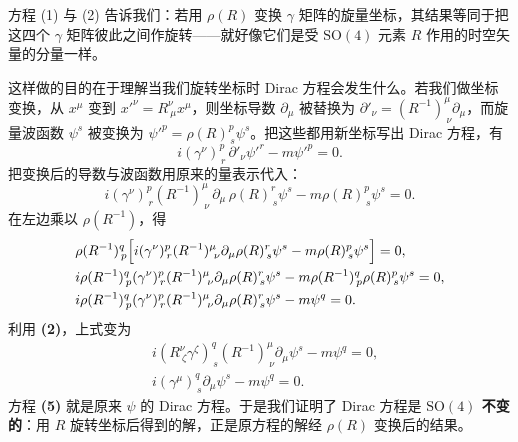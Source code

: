 方程 (1) 与 (2) 告诉我们：若用 $\rho(R)$ 变换 $\gamma$ 矩阵的旋量坐标，其结果等同于把这四个 $\gamma$ 矩阵彼此之间作旋转——就好像它们是受 $\mathrm{SO}(4)$ 元素 $R$ 作用的时空矢量的分量一样。

这样做的目的在于理解当我们旋转坐标时 Dirac 方程会发生什么。若我们做坐标变换，从 $x^{\mu}$ 变到 $x'^{\nu}=R^{\nu}_{\ \mu}x^{\mu}$，则坐标导数 $\partial_{\mu}$ 被替换为 $\partial'_{\nu}=(R^{-1})^{\mu}_{\ \nu}\partial_{\mu}$，而旋量波函数 $\psi^{s}$ 被变换为 $\psi'^{p}=\rho(R)^{p}_{\,s}\psi^{s}$。把这些都用新坐标写出 Dirac 方程，有
\begin{equation}
i(\gamma^{\nu})^{p}_{\,r}\,\partial'_{\nu}\psi'^{r}-m\psi'^{p}=0. \tag{3}
\end{equation}
把变换后的导数与波函数用原来的量表示代入：
\begin{equation}
i(\gamma^{\nu})^{p}_{\,r}(R^{-1})^{\mu}_{\ \nu}\,\partial_{\mu}\,\rho(R)^{r}_{\,s}\psi^{s}
-m\rho(R)^{p}_{\,s}\psi^{s}=0. \tag{4}
\end{equation}
在左边乘以 $\rho(R^{-1})$，得
\begin{align*}
&\rho(R^{-1})^{q}_{\,p}\Bigl[i(\gamma^{\nu})^{p}_{\,r}(R^{-1})^{\mu}_{\ \nu}\partial_{\mu}\rho(R)^{r}_{\,s}\psi^{s}
-m\rho(R)^{p}_{\,s}\psi^{s}\Bigr]=0,\\
&i\rho(R^{-1})^{q}_{\,p}(\gamma^{\nu})^{p}_{\,r}(R^{-1})^{\mu}_{\ \nu}\partial_{\mu}\rho(R)^{r}_{\,s}\psi^{s}
-m\rho(R^{-1})^{q}_{\,p}\rho(R)^{p}_{\,s}\psi^{s}=0,\\
&i\rho(R^{-1})^{q}_{\,p}(\gamma^{\nu})^{p}_{\,r}(R^{-1})^{\mu}_{\ \nu}\partial_{\mu}\rho(R)^{r}_{\,s}\psi^{s}
-m\psi^{q}=0 .
\end{align*}
利用 \textbf{(2)}，上式变为
\begin{align}
&i(R^{\nu}_{\ \zeta}\gamma^{\zeta})^{q}_{\,s}(R^{-1})^{\mu}_{\ \nu}\partial_{\mu}\psi^{s}-m\psi^{q}=0, \nonumber\\
&i(\gamma^{\mu})^{q}_{\,s}\partial_{\mu}\psi^{s}-m\psi^{q}=0. \tag{5}
\end{align}
方程 \textbf{(5)} 就是原来 $\psi$ 的 Dirac 方程。于是我们证明了 Dirac 方程是 \textbf{$\mathrm{SO}(4)$ 不变的}：用 $R$ 旋转坐标后得到的解，正是原方程的解经 $\rho(R)$ 变换后的结果。

